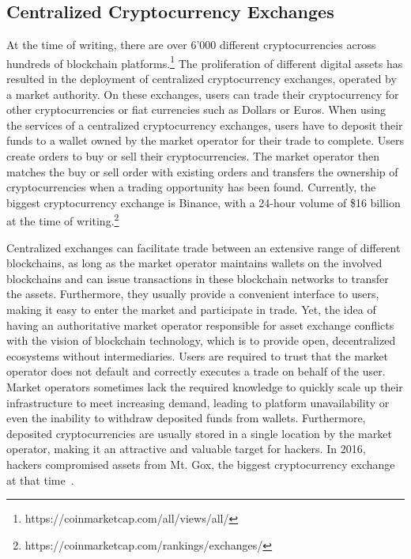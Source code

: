 \subsection{Centralized Cryptocurrency Exchanges}
At the time of writing, there are over 6'000 different cryptocurrencies across hundreds of blockchain platforms.\footnote{https://coinmarketcap.com/all/views/all/}
The proliferation of different digital assets has resulted in the deployment of centralized cryptocurrency exchanges, operated by a market authority.
On these exchanges, users can trade their cryptocurrency for other cryptocurrencies or fiat currencies such as Dollars or Euros.
When using the services of a centralized cryptocurrency exchanges, users have to deposit their funds to a wallet owned by the market operator for their trade to complete.
Users create orders to buy or sell their cryptocurrencies.
The market operator then matches the buy or sell order with existing orders and transfers the ownership of cryptocurrencies when a trading opportunity has been found.
Currently, the biggest cryptocurrency exchange is Binance, with a 24-hour volume of \$16 billion at the time of writing.\footnote{https://coinmarketcap.com/rankings/exchanges/}

Centralized exchanges can facilitate trade between an extensive range of different blockchains, as long as the market operator maintains wallets on the involved blockchains and can issue transactions in these blockchain networks to transfer the assets.
Furthermore, they usually provide a convenient interface to users, making it easy to enter the market and participate in trade.
Yet, the idea of having an authoritative market operator responsible for asset exchange conflicts with the vision of blockchain technology, which is to provide open, decentralized ecosystems without intermediaries.
Users are required to trust that the market operator does not default and correctly executes a trade on behalf of the user.
Market operators sometimes lack the required knowledge to quickly scale up their infrastructure to meet increasing demand, leading to platform unavailability or even the inability to withdraw deposited funds from wallets.
Furthermore, deposited cryptocurrencies are usually stored in a single location by the market operator, making it an attractive and valuable target for hackers.
In 2016, hackers compromised assets from Mt. Gox, the biggest cryptocurrency exchange at that time~\cite{trautman2014virtual}.


